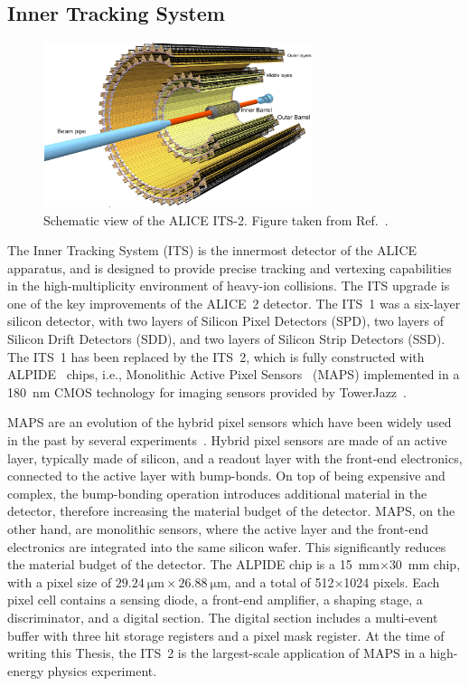 \subsection{Inner Tracking System}
\begin{figure}[htb]
    \centering
    \includegraphics[width=0.7\textwidth]{Figures/Chapter 3/ITS_Scheme.png}
    \caption{Schematic view of the ALICE ITS-2. Figure taken from Ref.~\cite{ALICE:2023udb}.}
    \label{fig:ITS}
\end{figure}
The Inner Tracking System (ITS) is the innermost detector of the ALICE apparatus, and is designed to provide precise tracking and vertexing capabilities in the high-multiplicity environment of heavy-ion collisions. The ITS upgrade is one of the key improvements of the ALICE~2 detector. The ITS~1 was a six-layer silicon detector, with two layers of Silicon Pixel Detectors (SPD), two layers of Silicon Drift Detectors (SDD), and two layers of Silicon Strip Detectors (SSD). The ITS~1 has been replaced by the ITS~2, which is fully constructed with ALPIDE~\cite{AglieriRinella:2017lym} chips, i.e., Monolithic Active Pixel Sensors~\cite{Snoeys:2014daa} (MAPS) implemented in a 180~nm CMOS technology for imaging sensors provided by TowerJazz~\cite{Senyukov:2013se}.

MAPS are an evolution of the hybrid pixel sensors which have been widely used in the past by several experiments~\cite{ALICE:2008ngc,CMS:1997tlf,Aad:2008zz,Bediaga:2013tje}. Hybrid pixel sensors are made of an active layer, typically made of silicon, and a readout layer with the front-end electronics, connected to the active layer with bump-bonds. On top of being expensive and complex, the bump-bonding operation introduces additional material in the detector, therefore increasing the material budget of the detector. MAPS, on the other hand, are monolithic sensors, where the active layer and the front-end electronics are integrated into the same silicon wafer. This significantly reduces the material budget of the detector. The ALPIDE chip is a 15~mm$\times$30~mm chip, with a pixel size of $\SI{29.24}{\micro\meter}\times\SI{26.88}{\micro\meter}$, and a total of 512$\times$1024 pixels. Each pixel cell contains a sensing diode, a front-end amplifier, a shaping stage, a discriminator, and a digital section. The digital section includes a multi-event buffer with three hit storage registers and a pixel mask register. At the time of writing this Thesis, the ITS~2 is the largest-scale application of MAPS in a high-energy physics experiment.

